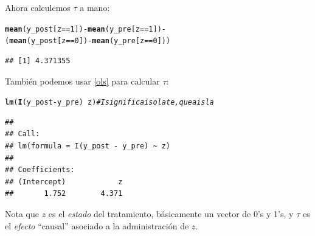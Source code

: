 \documentclass[onesided]{article}\usepackage[]{graphicx}\usepackage[]{color}
\makeatletter
\newcommand{\hlnum}[1]{\textcolor[rgb]{0.686,0.059,0.569}{#1}}%
\newcommand{\hlcom}[1]{\textcolor[rgb]{0.678,0.584,0.686}{\textit{#1}}}%
\newcommand{\hlopt}[1]{\textcolor[rgb]{0,0,0}{#1}}%
\newcommand{\hlstd}[1]{\textcolor[rgb]{0.345,0.345,0.345}{#1}}%
\newcommand{\hlkwd}[1]{\textcolor[rgb]{0.737,0.353,0.396}{\textbf{#1}}}%
\newenvironment{kframe}{%
 \def\at@end@of@kframe{}%
 \ifinner\ifhmode%
  \def\at@end@of@kframe{\end{minipage}}%
  \begin{minipage}{\columnwidth}%
 \fi\fi%
 \def\FrameCommand##1{\hskip\@totalleftmargin \hskip-\fboxsep
 \colorbox{shadecolor}{##1}\hskip-\fboxsep
     \hskip-\linewidth \hskip-\@totalleftmargin \hskip\columnwidth}%
 \MakeFramed {\advance\hsize-\width
   \@totalleftmargin\z@ \linewidth\hsize
   \@setminipage}}%
 {\par\unskip\endMakeFramed%
 \at@end@of@kframe}
\newenvironment{knitrout}{}{} %
\makeatother
\begin{document}
Ahora calculemos $\tau$ a mano:

\begin{knitrout}
\color{fgcolor}\begin{kframe}
\begin{alltt}
\hlkwd{mean}\hlstd{(y_post[z} \hlopt{==} \hlnum{1}\hlstd{])} \hlopt{-} \hlkwd{mean}\hlstd{(y_pre[z} \hlopt{==} \hlnum{1}\hlstd{])} \hlopt{-}
\hlstd{(}\hlkwd{mean}\hlstd{(y_post[z} \hlopt{==} \hlnum{0}\hlstd{])} \hlopt{-} \hlkwd{mean}\hlstd{(y_pre[z} \hlopt{==} \hlnum{0}\hlstd{]))}
\end{alltt}
\begin{verbatim}
## [1] 4.371355
\end{verbatim}
\end{kframe}
\end{knitrout}

Tambi\'en podemos usar \autoref{ols} para calcular $\tau$:

\begin{knitrout}
\color{fgcolor}\begin{kframe}
\begin{alltt}
\hlkwd{lm}\hlstd{(}\hlkwd{I}\hlstd{(y_post} \hlopt{-} \hlstd{y_pre)} \hlopt{~} \hlstd{z)} \hlcom{# I significa isolate, que aisla}
\end{alltt}
\begin{verbatim}
## 
## Call:
## lm(formula = I(y_post - y_pre) ~ z)
## 
## Coefficients:
## (Intercept)            z  
##       1.752        4.371
\end{verbatim}
\end{kframe}
\end{knitrout}

Nota que $z$ es el \emph{estado} del tratamiento, b\'asicamente un vector de 0's y 1's, y $\tau$ es el \emph{efecto} ``causal'' asociado a la administraci\'on de $z$. 
\end{document}
